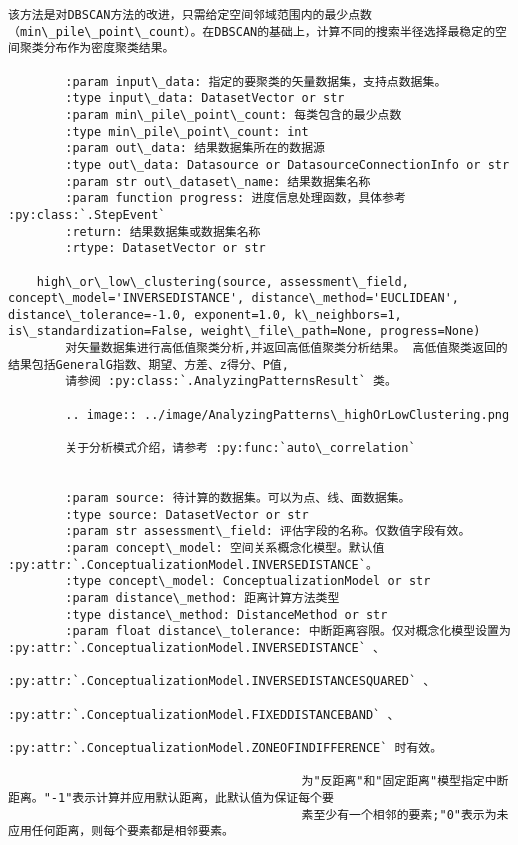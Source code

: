 \documentclass[11pt]{article}
\begin{document}
\begin{Verbatim}[commandchars=\\\{\}]
        该方法是对DBSCAN方法的改进，只需给定空间邻域范围内的最少点数（min\_pile\_point\_count）。在DBSCAN的基础上，计算不同的搜索半径选择最稳定的空间聚类分布作为密度聚类结果。
        
        :param input\_data: 指定的要聚类的矢量数据集，支持点数据集。
        :type input\_data: DatasetVector or str
        :param min\_pile\_point\_count: 每类包含的最少点数
        :type min\_pile\_point\_count: int
        :param out\_data: 结果数据集所在的数据源
        :type out\_data: Datasource or DatasourceConnectionInfo or str
        :param str out\_dataset\_name: 结果数据集名称
        :param function progress: 进度信息处理函数，具体参考 :py:class:`.StepEvent`
        :return: 结果数据集或数据集名称
        :rtype: DatasetVector or str
    
    high\_or\_low\_clustering(source, assessment\_field, concept\_model='INVERSEDISTANCE', distance\_method='EUCLIDEAN', distance\_tolerance=-1.0, exponent=1.0, k\_neighbors=1, is\_standardization=False, weight\_file\_path=None, progress=None)
        对矢量数据集进行高低值聚类分析,并返回高低值聚类分析结果。 高低值聚类返回的结果包括GeneralG指数、期望、方差、z得分、P值,
        请参阅 :py:class:`.AnalyzingPatternsResult` 类。
        
        .. image:: ../image/AnalyzingPatterns\_highOrLowClustering.png
        
        关于分析模式介绍，请参考 :py:func:`auto\_correlation`
        
        
        :param source: 待计算的数据集。可以为点、线、面数据集。
        :type source: DatasetVector or str
        :param str assessment\_field: 评估字段的名称。仅数值字段有效。
        :param concept\_model: 空间关系概念化模型。默认值 :py:attr:`.ConceptualizationModel.INVERSEDISTANCE`。
        :type concept\_model: ConceptualizationModel or str
        :param distance\_method: 距离计算方法类型
        :type distance\_method: DistanceMethod or str
        :param float distance\_tolerance: 中断距离容限。仅对概念化模型设置为 :py:attr:`.ConceptualizationModel.INVERSEDISTANCE` 、
                                         :py:attr:`.ConceptualizationModel.INVERSEDISTANCESQUARED` 、
                                         :py:attr:`.ConceptualizationModel.FIXEDDISTANCEBAND` 、
                                         :py:attr:`.ConceptualizationModel.ZONEOFINDIFFERENCE` 时有效。
        
                                         为"反距离"和"固定距离"模型指定中断距离。"-1"表示计算并应用默认距离，此默认值为保证每个要
                                         素至少有一个相邻的要素;"0"表示为未应用任何距离，则每个要素都是相邻要素。
        

\end{Verbatim}
\end{document}
